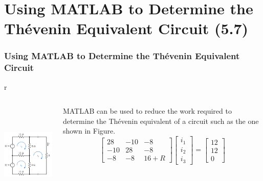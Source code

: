 \documentclass[aspectratio=169]{beamer}
\begin{document}
\section{Using MATLAB to Determine the Thévenin Equivalent Circuit (5.7)}
\begin{frame}[fragile]
\frametitle{Using MATLAB to Determine the Thévenin Equivalent Circuit}
\begin{tabular}{r}
	
	\begin{columns}
		\begin{column}{0.4\textwidth}  %
			\includegraphics[height=5cm]{figura32.png}\\

		\end{column}
		\begin{column}{0.6\textwidth}  %
			MATLAB can be used to reduce the work required to determine the Thévenin equivalent of a circuit
such as the one shown in Figure.
\newline
				\[ 
			\left[\begin{array}{rrr}
			28 & -10 & -8 \\
			-10 & 28 & -8 \\
			-8 & -8 & 16+R \end{array} \right]
			\left[\begin{array}{c}
			i_{1} \\
			i_{2} \\
			 i_{3}\end{array} \right]= 
			\left[\begin{array}{r}
			12 \\
			12 \\
			0  \end{array} \right]
			\]	
			

\end{column}
\end{columns}
\end{tabular}
\end{frame}
\end{document}
